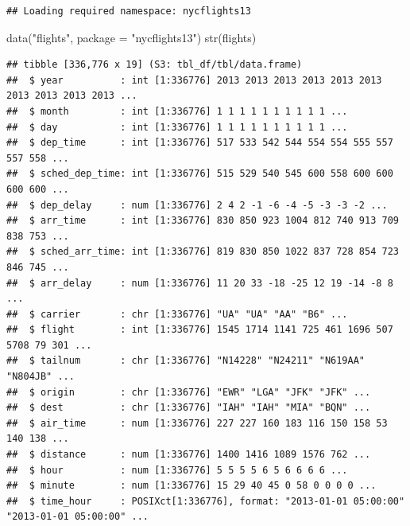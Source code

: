 \documentclass[
]{scrbook}
\newenvironment{Shaded}{\begin{snugshade}}{\end{snugshade}}
\newcommand{\AttributeTok}[1]{\textcolor[rgb]{0.77,0.63,0.00}{#1}}
\newcommand{\FunctionTok}[1]{\textcolor[rgb]{0.00,0.00,0.00}{#1}}
\newcommand{\NormalTok}[1]{#1}
\newcommand{\StringTok}[1]{\textcolor[rgb]{0.31,0.60,0.02}{#1}}
\renewenvironment{Shaded} {\begin{snugshade}\small} {\end{snugshade}}
\begin{document}
\begin{verbatim}
## Loading required namespace: nycflights13
\end{verbatim}

\begin{Shaded}
\begin{Highlighting}[]
\FunctionTok{data}\NormalTok{(}\StringTok{"flights"}\NormalTok{, }\AttributeTok{package =} \StringTok{"nycflights13"}\NormalTok{)}
\FunctionTok{str}\NormalTok{(flights)}
\end{Highlighting}
\end{Shaded}

\begin{verbatim}
## tibble [336,776 x 19] (S3: tbl_df/tbl/data.frame)
##  $ year          : int [1:336776] 2013 2013 2013 2013 2013 2013 2013 2013 2013 2013 ...
##  $ month         : int [1:336776] 1 1 1 1 1 1 1 1 1 1 ...
##  $ day           : int [1:336776] 1 1 1 1 1 1 1 1 1 1 ...
##  $ dep_time      : int [1:336776] 517 533 542 544 554 554 555 557 557 558 ...
##  $ sched_dep_time: int [1:336776] 515 529 540 545 600 558 600 600 600 600 ...
##  $ dep_delay     : num [1:336776] 2 4 2 -1 -6 -4 -5 -3 -3 -2 ...
##  $ arr_time      : int [1:336776] 830 850 923 1004 812 740 913 709 838 753 ...
##  $ sched_arr_time: int [1:336776] 819 830 850 1022 837 728 854 723 846 745 ...
##  $ arr_delay     : num [1:336776] 11 20 33 -18 -25 12 19 -14 -8 8 ...
##  $ carrier       : chr [1:336776] "UA" "UA" "AA" "B6" ...
##  $ flight        : int [1:336776] 1545 1714 1141 725 461 1696 507 5708 79 301 ...
##  $ tailnum       : chr [1:336776] "N14228" "N24211" "N619AA" "N804JB" ...
##  $ origin        : chr [1:336776] "EWR" "LGA" "JFK" "JFK" ...
##  $ dest          : chr [1:336776] "IAH" "IAH" "MIA" "BQN" ...
##  $ air_time      : num [1:336776] 227 227 160 183 116 150 158 53 140 138 ...
##  $ distance      : num [1:336776] 1400 1416 1089 1576 762 ...
##  $ hour          : num [1:336776] 5 5 5 5 6 5 6 6 6 6 ...
##  $ minute        : num [1:336776] 15 29 40 45 0 58 0 0 0 0 ...
##  $ time_hour     : POSIXct[1:336776], format: "2013-01-01 05:00:00" "2013-01-01 05:00:00" ...
\end{verbatim}
\end{document}
